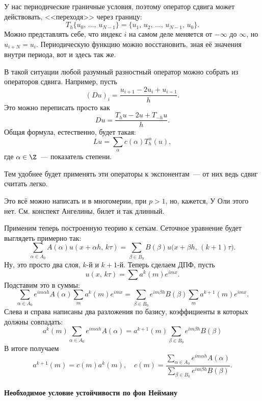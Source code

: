 \documentclass{trlnotes}
\begin{document}
\begin{rem}
	У нас периодические граничные условия, поэтому оператор сдвига может действовать, <<переходя>> через границу:
	\[
		T_h \{u_0, \, \ldots, \, u_{N - 1}\} = \{u_{1}, \, u_2, \, \ldots, \, u_{N-1}, \, u_0\}.
	\]
	Можно представлять себе, что индекс $i$ на самом деле меняется от $-\infty$ до $\infty$, но $u_{i + N} = u_i$. Периодическую функцию можно восстановить, зная её значения внутри периода, вот и здесь так же.
\end{rem}

\begin{rem}
	В такой ситуации любой разумный разностный оператор можно собрать из операторов сдвига. Например, пусть
	\[
		(Du)_i = \dfrac{u_{i + 1} - 2u_i + u_{i - 1}}{h}.
	\]
	Это можно переписать просто как
	\[
		Du = \dfrac{T_hu - 2u + T_{-h}u}{h}.
	\]
	Общая формула, естественно, будет такая:
	\[
		Lu = \sum\limits_{\alpha} c(\alpha) T_h^{\alpha}(u),
	\]
	где $\alpha \in \Z$~--- показатель степени.

	Тем удобнее будет применять эти операторы к экспонентам~--- от них ведь сдвиг считать легко.
\end{rem}

Это всё можно написать и в многомерии, при $p>1$, но, кажется, У Оли этого нет. См. конспект Ангелины, билет и так длинный.

Применим теперь построенную теорию к сеткам. Сеточное уравнение будет выглядеть примерно так:
\[
	\sum\limits_{\alpha \in A_0} A(\alpha) u(x + \alpha h, \, k \tau) = \sum\limits_{\beta \in B_0} B(\beta) u\big(x + \beta h, \, (k+1) \tau\big).
\]
Ну, это просто два слоя, $k$-й и $k+1$-й. Теперь сделаем ДПФ, пусть
\[
	u(x, \, k\tau) = \sum a^k(m) e^{imx}.
\]
Подставим это в суммы:
\[
	\sum\limits_{\alpha \in A_0} e^{im\alpha h} A(\alpha) \sum\limits_m a^k(m) e^{imx} = \sum\limits_{\beta \in B_0} e^{im\beta h} B(\beta) \sum\limits_m a^{k+1}(m) e^{imx}.
\]
Слева и справа написаны два разложения по базису, коэффициенты в которых должны совпадать:
\[
	a^k(m) \sum\limits_{\alpha \in A_0} e^{im\alpha h} A(\alpha)  = a^{k+1}(m) \sum\limits_{\beta \in B_0} e^{im\beta h} B(\beta) 
\]
В итоге получаем
\[
	a^{k + 1}(m) = c(m) a^k(m), \quad c(m) = \dfrac{\sum\limits_{\alpha \in A_0} e^{im\alpha h} A(\alpha)}{\sum\limits_{\beta \in B_0} e^{im\beta h} B(\beta)}.
\]

\paragraph{Необходимое условие устойчивости по фон Нейману}\label{par:neumann}
\end{document}
